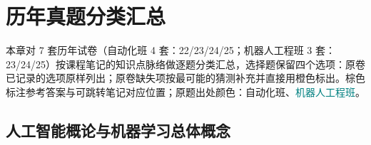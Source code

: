 ﻿\documentclass[../main.tex]{subfiles}
\begin{document}
\section{历年真题分类汇总}


\newcommand{\src}[2]{\hyperref[#1]{#2}}
\long{}
\newcommand{\autosup}[1]{\textcolor{examanswer}{#1}}

\noindent 本章对 7 套历年试卷（自动化班 4 套：22/23/24/25；机器人工程班 3 套：23/24/25）按课程笔记的知识点脉络做逐题分类汇总，选择题保留四个选项：原卷已记录的选项原样列出；原卷缺失项按最可能的猜测补充并直接用\textcolor{examanswer}{橙色}标出。\textcolor{autosupbrown}{棕色}标注参考答案与可跳转笔记对应位置；原题出处颜色：\textcolor{autoclassgreen}{自动化班}、\textcolor{teal}{机器人工程班}。

\subsection{人工智能概论与机器学习总体概念}
\end{document}
